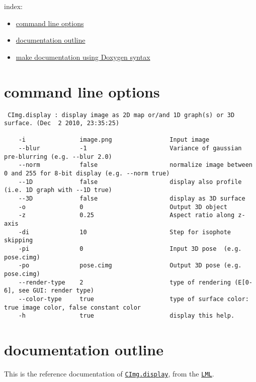 index: \begin{itemize}
\item \hyperlink{index_sectionCommandLine}{command line options} \item \hyperlink{index_sectionDisplayDocumentation}{documentation outline} \item \hyperlink{index_sectionDoxygenSyntax}{make documentation using Doxygen syntax}\end{itemize}
\hypertarget{index_sectionCommandLine}{}\section{command line options}\label{index_sectionCommandLine}


\begin{VerbInclude}\begin{verbatim}
 CImg.display : display image as 2D map or/and 1D graph(s) or 3D surface. (Dec  2 2010, 23:35:25)

    -i               image.png                Input image
    --blur           -1                       Variance of gaussian pre-blurring (e.g. --blur 2.0)
    --norm           false                    normalize image between 0 and 255 for 8-bit display (e.g. --norm true)
    --1D             false                    display also profile (i.e. 1D graph with --1D true)
    --3D             false                    display as 3D surface
    -o               0                        Output 3D object
    -z               0.25                     Aspect ratio along z-axis
    -di              10                       Step for isophote skipping
    -pi              0                        Input 3D pose  (e.g. pose.cimg)
    -po              pose.cimg                Output 3D pose (e.g. pose.cimg)
    --render-type    2                        type of rendering (E[0-6], see GUI: render type)
    --color-type     true                     type of surface color: true image color, false constant color
    -h               true                     display this help.
\end{verbatim}
\end{VerbInclude}
\hypertarget{index_sectionDisplayDocumentation}{}\section{documentation outline}\label{index_sectionDisplayDocumentation}
This is the reference documentation of \href{http://www.meol.cnrs.fr/}{\tt CImg.display}, from the \href{http://www.univ-lille1.fr/lml/}{\tt LML}.\par
